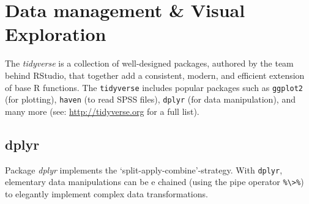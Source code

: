 \documentclass[]{book}
\newenvironment{Shaded}{\begin{snugshade}}{\end{snugshade}}
\newcommand{\KeywordTok}[1]{\textcolor[rgb]{0.13,0.29,0.53}{\textbf{#1}}}
\newcommand{\DataTypeTok}[1]{\textcolor[rgb]{0.13,0.29,0.53}{#1}}
\newcommand{\DecValTok}[1]{\textcolor[rgb]{0.00,0.00,0.81}{#1}}
\newcommand{\StringTok}[1]{\textcolor[rgb]{0.31,0.60,0.02}{#1}}
\newcommand{\CommentTok}[1]{\textcolor[rgb]{0.56,0.35,0.01}{\textit{#1}}}
\newcommand{\OperatorTok}[1]{\textcolor[rgb]{0.81,0.36,0.00}{\textbf{#1}}}
\newcommand{\NormalTok}[1]{#1}
\begin{document}
\section{Data management \& Visual
Exploration}\label{data-management-visual-exploration}


The \emph{tidyverse} is a collection of well-designed packages, authored
by the team behind RStudio, that together add a consistent, modern, and
efficient extension of base R functions. The \texttt{tidyverse} includes
popular packages such as \texttt{ggplot2} (for plotting), \texttt{haven}
(to read SPSS files), \texttt{dplyr} (for data manipulation), and many
more (see: \url{http://tidyverse.org} for a full list).

\subsection{dplyr}\label{dplyr}


Package \emph{dplyr} \citep{R-dplyr} implements the
`split-apply-combine'-strategy. With \texttt{dplyr}, elementary data
manipulations can be e chained (using the pipe operator
\texttt{\%\textbackslash{}\textgreater{}\%}) to elegantly implement
complex data transformations.

\begin{Shaded}
\end{Shaded}
\end{document}
